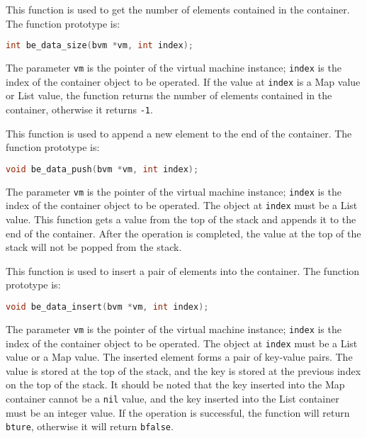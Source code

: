 This function is used to get the number of elements contained in the container. The function prototype is:
\begin{lstlisting}[language=c, style=berry, numbers=none]
int be_data_size(bvm *vm, int index);
\end{lstlisting}
The parameter \texttt{vm} is the pointer of the virtual machine instance; \texttt{index} is the index of the container object to be operated. If the value at \texttt{index} is a Map value or List value, the function returns the number of elements contained in the container, otherwise it returns \texttt{-1}.


This function is used to append a new element to the end of the container. The function prototype is:
\begin{lstlisting}[language=c, style=berry, numbers=none]
void be_data_push(bvm *vm, int index);
\end{lstlisting}
The parameter \texttt{vm} is the pointer of the virtual machine instance; \texttt{index} is the index of the container object to be operated. The object at \texttt{index} must be a List value. This function gets a value from the top of the stack and appends it to the end of the container. After the operation is completed, the value at the top of the stack will not be popped from the stack.


This function is used to insert a pair of elements into the container. The function prototype is:
\begin{lstlisting}[language=c, style=berry, numbers=none]
void be_data_insert(bvm *vm, int index);
\end{lstlisting}
The parameter \texttt{vm} is the pointer of the virtual machine instance; \texttt{index} is the index of the container object to be operated. The object at \texttt{index} must be a List value or a Map value. The inserted element forms a pair of key-value pairs. The value is stored at the top of the stack, and the key is stored at the previous index on the top of the stack. It should be noted that the key inserted into the Map container cannot be a \texttt{nil} value, and the key inserted into the List container must be an integer value. If the operation is successful, the function will return \texttt{bture}, otherwise it will return \texttt{bfalse}.


